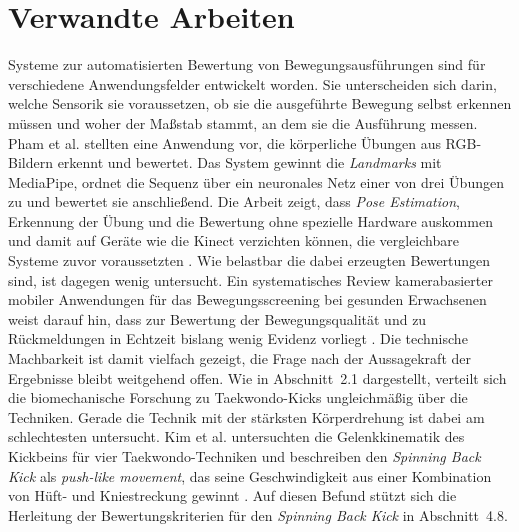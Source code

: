 \documentclass[intern]{cgMA}
\begin{document}
\section{Verwandte Arbeiten}
Systeme zur automatisierten Bewertung von Bewegungsausführungen sind für verschiedene Anwendungsfelder entwickelt worden. Sie unterscheiden sich darin, welche Sensorik sie voraussetzen, ob sie die ausgeführte Bewegung selbst erkennen müssen und woher der Maßstab stammt, an dem sie die Ausführung messen.
Pham et al. \cite{Pham2022} stellten eine Anwendung vor, die körperliche Übungen aus RGB-Bildern erkennt und bewertet. Das System gewinnt die \textit{Landmarks} mit MediaPipe, ordnet die Sequenz über ein neuronales Netz einer von drei Übungen zu und bewertet sie anschließend. Die Arbeit zeigt, dass \textit{Pose Estimation}, Erkennung der Übung und die Bewertung ohne spezielle Hardware auskommen und damit auf Geräte wie die Kinect verzichten können, die vergleichbare Systeme zuvor voraussetzten \cite{Pham2022}.
Wie belastbar die dabei erzeugten Bewertungen sind, ist dagegen wenig untersucht. Ein systematisches Review kamerabasierter mobiler Anwendungen für das Bewegungsscreening bei gesunden Erwachsenen weist darauf hin, dass zur Bewertung der Bewegungsqualität und zu Rückmeldungen in Echtzeit bislang wenig Evidenz vorliegt \cite{ElRajab2025}. Die technische Machbarkeit ist damit vielfach gezeigt, die Frage nach der Aussagekraft der Ergebnisse bleibt weitgehend offen.
Wie in Abschnitt~2.1 dargestellt, verteilt sich die biomechanische Forschung zu Taekwondo-Kicks ungleichmäßig über die Techniken. Gerade die Technik mit der stärksten Körperdrehung ist dabei am schlechtesten untersucht. Kim et al. \cite{Kim2011} untersuchten die Gelenkkinematik des Kickbeins für vier Taekwondo-Techniken und beschreiben den \textit{Spinning Back Kick} als \textit{push-like movement}, das seine Geschwindigkeit aus einer Kombination von Hüft- und Kniestreckung gewinnt \cite{Kim2011}. Auf diesen Befund stützt sich die Herleitung der Bewertungskriterien für den \textit{Spinning Back Kick} in Abschnitt~4.8.
\end{document}
